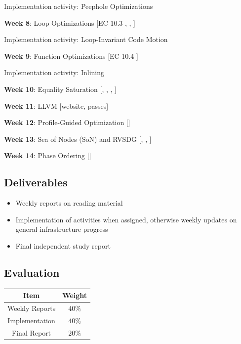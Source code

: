 \documentclass[11pt, a4paper, titlepage]{article}
\begin{document}
\indent Implementation activity: Peephole Optimizations
\vspace{0.1cm}

\noindent \textbf{Week 8}: Loop Optimizations [EC 10.3 \cite{ec}, \cite{loopopts}, \cite{polly}]

\indent Implementation activity: Loop-Invariant Code Motion
\vspace{0.1cm}

\noindent \textbf{Week 9}: Function Optimizations [EC 10.4 \cite{ec}]

\indent Implementation activity: Inlining
\vspace{0.1cm}

\noindent \textbf{Week 10}: Equality Saturation [\cite{eqsat-opt}, \cite{aegraphs}, \cite{optwithegraphs}, \cite{egg}]
\vspace{0.1cm}

\noindent \textbf{Week 11}: LLVM [website, passes]
\vspace{0.1cm}

\noindent \textbf{Week 12}: Profile-Guided Optimization [\cite{pgo}]
\vspace{0.1cm}

\noindent \textbf{Week 13}: Sea of Nodes (SoN) and RVSDG [\cite{son}, \cite{simple}, \cite{rvsdg}] 
\vspace{0.1cm}

\noindent \textbf{Week 14}: Phase Ordering [\cite{phaseordering}]
\vspace{0.1cm}

\subsection{Deliverables}
\begin{itemize}
    \item Weekly reports on reading material
    \item Implementation of activities when assigned, otherwise weekly updates on general infrastructure progress
    \item Final independent study report
  \end{itemize}

\subsection{Evaluation}
\begin{center}
\begin{tabular}{ | c | c | }
    \hline
    \textbf{Item} & \textbf{Weight} \\
    \hline
    Weekly Reports & $40\%$ \\
    \hline
    Implementation & $40\%$ \\
    \hline
    Final Report & $20\%$ \\
    \hline
\end{tabular}
\end{center}
\end{document}
